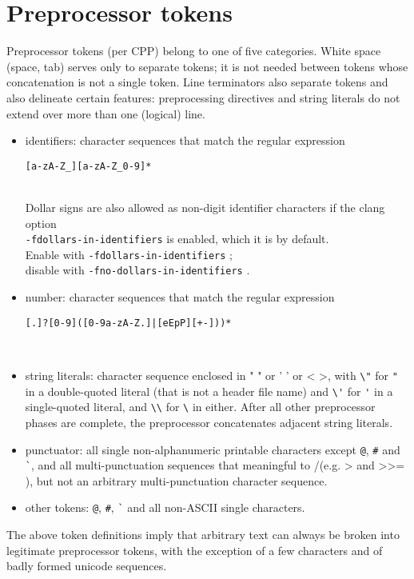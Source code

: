 \section{Preprocessor tokens}
Preprocessor tokens (per CPP) belong to one of five categories. White space (space, tab) serves only to separate tokens; it is not needed between tokens whose concatenation is not a single token. Line terminators also separate tokens and also delineate certain features: preprocessing directives and string literals do not extend over more than one (logical) line.
\begin{itemize}
	\item identifiers: character sequences that match the regular expression \\
\centerline{\texttt{[a-zA-Z\_][a-zA-Z\_0-9]*}} \\ 
Dollar signs are also allowed as non-digit identifier characters if the clang option\\ \texttt{-fdollars-in-identifiers} is enabled, which it is by default. \\
Enable with \texttt{-fdollars-in-identifiers} ; \\disable with \texttt{-fno-dollars-in-identifiers} .
	\item number: character sequences that match the regular expression  \\
\centerline{\texttt{[.]?[0-9]([0-9a-zA-Z.]|[eEpP][+-]))*}}  \\

	\item string literals: character sequence enclosed in " " or ' ' or < >, with \lstinline|\"| for \lstinline|"| in a double-quoted literal (that is not a header file name) and \lstinline|\'| for \lstinline|'| in a single-quoted literal, and \lstinline|\\| for \lstinline|\| in either. After all other preprocessor phases are complete, the preprocessor concatenates adjacent string literals.
	\item punctuator: all single non-alphanumeric printable characters except 
\verb|@|, \verb|#| and \verb|`|, and all multi-punctuation sequences that meaningful to \C/\cpp (e.g. > and >{>}= ), but not an arbitrary multi-punctuation character sequence.
	\item other tokens: \verb|@|, \verb|#|, \verb|`| and all non-ASCII single characters.
\end{itemize}
The above token definitions imply that arbitrary text can always be broken into
legitimate preprocessor tokens, with the exception of a few characters and of badly formed unicode sequences.


